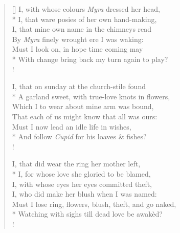 \documentclass[MAIN]{subfiles}
\begin{document}
\begin{verse}[\versewidth]
I, with whose colours \emph{Myra} dressed her head,\\* 
\vin I, that ware posies of her own hand-making,\\
I, that mine own name in the chimneys read\\
\vin By \emph{Myra} finely wrought ere I was waking:\\
Must I look on, in hope time coming may\\*
With change bring back my turn again to play?\\!

I, that on sunday at the church-stile found\\*
\vin A garland sweet, with true-love knots in flowers,\\
Which I to wear about mine arm was bound,\\
\vin That each of us might know that all was ours:\\
Must I now lead an idle life in wishes,\\*
And follow \emph{Cupid} for his loaves \& fishes?\\!

I, that did wear the ring her mother left,\\*
\vin I, for whose love she gloried to be blamed,\\
I, with whose eyes her eyes committed theft,\\
\vin I, who did make her blush when I was named:\\
Must I lose ring, flowers, blush, theft, and go naked,\\*
Watching with sighs till dead love be awak\`ed?\\!


\end{verse}
\end{document}
